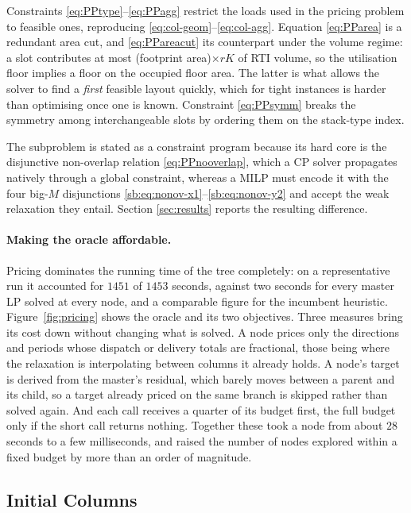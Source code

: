 Constraints \eqref{eq:PPtype}--\eqref{eq:PPagg} restrict the loads
used in the pricing problem to feasible ones, reproducing
\eqref{eq:col-geom}--\eqref{eq:col-agg}.
Equation \eqref{eq:PParea} is a redundant area cut, and
\eqref{eq:PPareacut} its counterpart under the volume regime: a slot
contributes at most (footprint area)$\times rK$ of RTI volume, so the
utilisation floor implies a floor on the occupied floor area. The
latter is what allows the solver to find a \emph{first} feasible
layout quickly, which for tight instances is harder than optimising
once one is known. Constraint \eqref{eq:PPsymm} breaks the symmetry
among interchangeable slots by ordering them on the stack-type index.

The subproblem is stated as a constraint program because its hard
core is the disjunctive non-overlap relation
\eqref{eq:PPnooverlap}, which a CP solver propagates natively through
a global constraint, whereas a MILP must encode it with the four
big-$M$ disjunctions
\eqref{sb:eq:nonov-x1}--\eqref{sb:eq:nonov-y2} and accept the weak
relaxation they entail. Section \ref{sec:results} reports the
resulting difference.

\paragraph{Making the oracle affordable.}
Pricing dominates the running time of the tree completely: on a
representative run it accounted for $1451$ of $1453$ seconds, against
two seconds for every master LP solved at every node, and a comparable
figure for the incumbent heuristic. Figure~\ref{fig:pricing} shows the oracle and its two objectives. Three measures bring its cost down without changing what is solved. A node prices only the directions and
periods whose dispatch or delivery totals are fractional, those being
where the relaxation is interpolating between columns it already
holds. A node's target is derived from the master's residual, which
barely moves between a parent and its child, so a target already
priced on the same branch is skipped rather than solved again. And
each call receives a quarter of its budget first, the full budget only
if the short call returns nothing. Together these took a node from
about $28$ seconds to a few milliseconds, and raised the number of
nodes explored within a fixed budget by more than an order of
magnitude.



\subsection{Initial Columns}
\label{sec:initcols}

